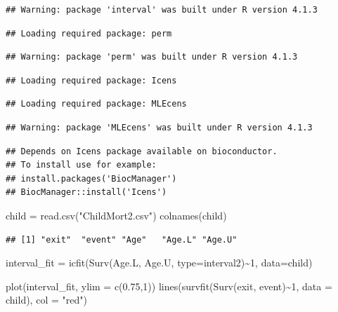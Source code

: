 \documentclass[
]{article}
\newenvironment{Shaded}{\begin{snugshade}}{\end{snugshade}}
\newcommand{\AttributeTok}[1]{\textcolor[rgb]{0.77,0.63,0.00}{#1}}
\newcommand{\DecValTok}[1]{\textcolor[rgb]{0.00,0.00,0.81}{#1}}
\newcommand{\FloatTok}[1]{\textcolor[rgb]{0.00,0.00,0.81}{#1}}
\newcommand{\FunctionTok}[1]{\textcolor[rgb]{0.00,0.00,0.00}{#1}}
\newcommand{\NormalTok}[1]{#1}
\newcommand{\OtherTok}[1]{\textcolor[rgb]{0.56,0.35,0.01}{#1}}
\newcommand{\SpecialCharTok}[1]{\textcolor[rgb]{0.00,0.00,0.00}{#1}}
\newcommand{\StringTok}[1]{\textcolor[rgb]{0.31,0.60,0.02}{#1}}
\begin{document}
\begin{verbatim}
## Warning: package 'interval' was built under R version 4.1.3
\end{verbatim}

\begin{verbatim}
## Loading required package: perm
\end{verbatim}

\begin{verbatim}
## Warning: package 'perm' was built under R version 4.1.3
\end{verbatim}

\begin{verbatim}
## Loading required package: Icens
\end{verbatim}

\begin{verbatim}
## Loading required package: MLEcens
\end{verbatim}

\begin{verbatim}
## Warning: package 'MLEcens' was built under R version 4.1.3
\end{verbatim}

\begin{verbatim}
## Depends on Icens package available on bioconductor. 
## To install use for example:
## install.packages('BiocManager')
## BiocManager::install('Icens')
\end{verbatim}

\begin{Shaded}
\begin{Highlighting}[]
\NormalTok{child }\OtherTok{=} \FunctionTok{read.csv}\NormalTok{(}\StringTok{"ChildMort2.csv"}\NormalTok{)}
\FunctionTok{colnames}\NormalTok{(child)}
\end{Highlighting}
\end{Shaded}

\begin{verbatim}
## [1] "exit"  "event" "Age"   "Age.L" "Age.U"
\end{verbatim}

\begin{Shaded}
\begin{Highlighting}[]
\NormalTok{interval\_fit }\OtherTok{=} \FunctionTok{icfit}\NormalTok{(}\FunctionTok{Surv}\NormalTok{(Age.L, Age.U, }\AttributeTok{type=}\StringTok{\textquotesingle{}interval2\textquotesingle{}}\NormalTok{)}\SpecialCharTok{\textasciitilde{}}\DecValTok{1}\NormalTok{,}
             \AttributeTok{data=}\NormalTok{child)}

\FunctionTok{plot}\NormalTok{(interval\_fit, }\AttributeTok{ylim =} \FunctionTok{c}\NormalTok{(}\FloatTok{0.75}\NormalTok{,}\DecValTok{1}\NormalTok{))}
\FunctionTok{lines}\NormalTok{(}\FunctionTok{survfit}\NormalTok{(}\FunctionTok{Surv}\NormalTok{(exit, event)}\SpecialCharTok{\textasciitilde{}}\DecValTok{1}\NormalTok{, }\AttributeTok{data =}\NormalTok{ child), }\AttributeTok{col =} \StringTok{"red"}\NormalTok{)}
\end{Highlighting}
\end{Shaded}
\end{document}
